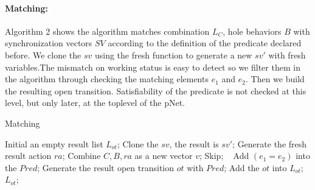 \documentclass{lncs/llncs}
\begin{document}
%
%

\paragraph{Matching:} Algorithm 2 shows the algorithm matches
combination $L_C$, hole behaviors $B$ with synchronization vectors
$SV$ according to the definition of the predicate declared before. We
clone the $sv$ using the fresh function to generate a new $sv'$ with
fresh variables.The mismatch on working status is easy to detect so we
filter them in the algorithm through checking the matching elements
$e_1$ and $e_2$. 
Then we build the resulting open transition. Satisfiability of the
predicate is not checked at this level, but only later, at the
toplevel of the pNet.

\begin{algorithm}
\caption{Matching}
\begin{algorithmic}[1]

\State Initial an empty result list $L_{ot}$;
		\State Clone the $sv$, the result is $sv'$;
		\State Generate the fresh result action $ra$;
		\State Combine $C, B, ra$ as a new vector $v$;
			\State Skip;
			\Else ~ Add $(e_1 = e_2)$ into the $Pred$;
			\EndIf
		\EndFor
		\State Generate the result open transition $ot$ with $Pred$;
		\State Add the $ot$ into $L_{ot}$;
	\EndFor
\EndFor 
\State \Return $L_{ot}$;

\end{algorithmic} 
\end{algorithm}
\end{document}
